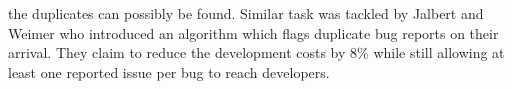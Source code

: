the duplicates can possibly be found. Similar task was tackled by Jalbert and Weimer \cite{jalbert2008automated} who introduced an algorithm which flags duplicate bug reports on their arrival. They claim to reduce the development costs by 8\% while still allowing at least one reported issue per bug to reach developers.